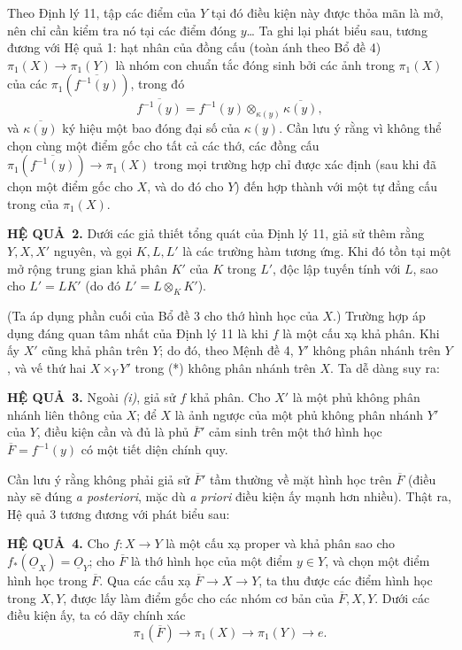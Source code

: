 \documentclass[11pt,twoside,openany]{book}
\numberwithin{equation}{section}
\newcommand{\src}[1]{%
  \phantomsection\hypertarget{src:\fgasourceid:#1}{}%
  \marginpar{\raggedleft\footnotesize\sffamily #1}%
}
\newcommand{\fgasourceid}{unset}
\newcommand{\Osh}{\underline{O}}
\newcommand{\result}[2]{\par\medskip\noindent\textbf{#1\if\relax\detokenize{#2}\relax\else\ #2\fi.}\quad}
\begin{document}
Theo Định lý 11, tập các điểm của $Y$ tại đó điều kiện này được thỏa mãn là
mở, nên chỉ cần kiểm tra nó tại các điểm đóng $y$\ldots{} Ta ghi lại phát biểu
sau, tương đương với Hệ quả 1: hạt nhân của đồng cấu (toàn ánh theo Bổ đề 4)
$\pi_1(X)\longrightarrow\pi_1(Y)$ là nhóm con chuẩn tắc đóng sinh bởi các ảnh
trong $\pi_1(X)$ của các $\pi_1(\overline{f^{-1}(y)})$, trong đó
\[
  \overline{f^{-1}(y)}
  =f^{-1}(y)\otimes_{\kappa(y)}\overline{\kappa(y)},
\]
và $\overline{\kappa(y)}$ ký hiệu một bao đóng đại số của $\kappa(y)$. Cần lưu
ý rằng vì không thể chọn cùng một điểm gốc cho tất cả các thớ, các đồng cấu
$\pi_1(\overline{f^{-1}(y)})\longrightarrow\pi_1(X)$ trong mọi trường hợp chỉ
được xác định (sau khi đã chọn một điểm gốc cho $X$, và do đó cho $Y$) đến hợp
thành với một tự đẳng cấu trong của $\pi_1(X)$.

\result{HỆ QUẢ}{2} Dưới các giả thiết tổng quát của Định lý 11, giả sử thêm
rằng $Y,X,X'$ nguyên, và gọi $K,L,L'$ là các trường hàm tương ứng. Khi đó tồn
tại một mở rộng trung gian khả phân $K'$ của $K$ trong $L'$, độc lập tuyến
tính với $L$, sao cho $L'=LK'$ (do đó $L'=L\otimes_K K'$).

(Ta áp dụng phần cuối của Bổ đề 3 cho thớ hình học của $X$.) Trường hợp áp dụng
đáng quan tâm nhất của Định lý 11 là khi $f$ là một cấu xạ khả phân. Khi ấy
$X'$ cũng khả phân trên $Y$; do đó, theo Mệnh đề 4, $Y'$ không phân nhánh trên
$Y$, và vế thứ hai $X\times_Y Y'$ trong (*) không phân nhánh trên $X$. Ta dễ
dàng suy ra:

\result{HỆ QUẢ}{3} Ngoài \textit{(i)}, giả sử $f$ khả phân. Cho $X'$ là một
phủ không phân nhánh liên thông của $X$; để
$X$ là ảnh ngược của một phủ không phân nhánh $Y'$ của $Y$,
điều kiện cần và đủ là phủ $\overline F'$ cảm sinh trên một thớ hình học
$\overline F=f^{-1}(y)$ có một tiết diện chính quy.

Cần lưu ý rằng không phải giả sử $\overline F'$ tầm thường về mặt hình học
trên $\overline F$ (điều này sẽ đúng \textit{a posteriori}, mặc dù
\textit{a priori} điều kiện ấy mạnh hơn nhiều). Thật ra, Hệ quả 3 tương đương
với phát biểu sau:

\src{215}
\result{HỆ QUẢ}{4} Cho $f:X\longrightarrow Y$ là một cấu xạ proper và khả
phân sao cho $f_*(\Osh_X)=\Osh_Y$; cho $\overline F$ là thớ hình học của một
điểm $y\in Y$, và chọn một điểm hình học trong $\overline F$. Qua các cấu xạ
$\overline F\longrightarrow X\longrightarrow Y$, ta thu được các điểm hình
học trong $X,Y$, được lấy làm điểm gốc cho các nhóm cơ bản của
$\overline F,X,Y$. Dưới các điều kiện ấy, ta có dãy chính xác
\[
  \boxed{
    \pi_1(\overline F)\longrightarrow\pi_1(X)
    \longrightarrow\pi_1(Y)\longrightarrow e
  }.
\]
\end{document}
